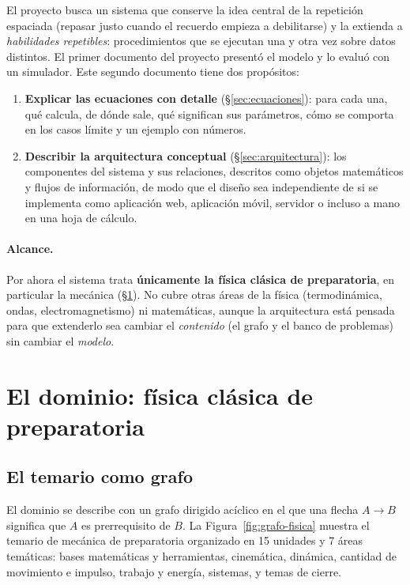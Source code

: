 \documentclass[11pt]{article}
\theoremstyle{definition}
\theoremstyle{remark}
\begin{document}
El proyecto busca un sistema que conserve la idea central de la repetición espaciada (repasar justo cuando el recuerdo empieza a debilitarse) y la extienda a \emph{habilidades repetibles}: procedimientos que se ejecutan una y otra vez sobre datos distintos. El primer documento del proyecto presentó el modelo y lo evaluó con un simulador. Este segundo documento tiene dos propósitos:

\begin{enumerate}
\item \textbf{Explicar las ecuaciones con detalle} (\S\ref{sec:ecuaciones}): para cada una, qué calcula, de dónde sale, qué significan sus parámetros, cómo se comporta en los casos límite y un ejemplo con números.
\item \textbf{Describir la arquitectura conceptual} (\S\ref{sec:arquitectura}): los componentes del sistema y sus relaciones, descritos como objetos matemáticos y flujos de información, de modo que el diseño sea independiente de si se implementa como aplicación web, aplicación móvil, servidor o incluso a mano en una hoja de cálculo.
\end{enumerate}

\paragraph{Alcance.} Por ahora el sistema trata \textbf{únicamente la física clásica de preparatoria}, en particular la mecánica (\S\ref{sec:dominio}). No cubre otras áreas de la física (termodinámica, ondas, electromagnetismo) ni matemáticas, aunque la arquitectura está pensada para que extenderlo sea cambiar el \emph{contenido} (el grafo y el banco de problemas) sin cambiar el \emph{modelo}.

\section{El dominio: física clásica de preparatoria}
\label{sec:dominio}

\subsection{El temario como grafo}

El dominio se describe con un grafo dirigido acíclico en el que una flecha $A\to B$ significa que $A$ es prerrequisito de $B$. La Figura~\ref{fig:grafo-fisica} muestra el temario de mecánica de preparatoria organizado en 15 unidades y 7 áreas temáticas: bases matemáticas y herramientas, cinemática, dinámica, cantidad de movimiento e impulso, trabajo y energía, sistemas, y temas de cierre.
\end{document}
